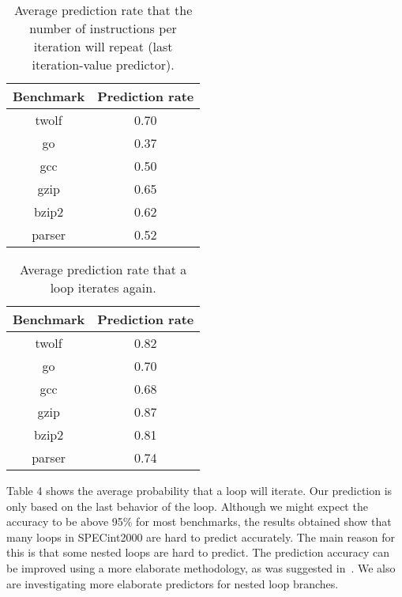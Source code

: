 \documentclass[times,10pt,twocolumn]{article}
\begin{document}
\begin{table}[htb]
\caption{Average prediction rate that the number of 
instructions per iteration will repeat (last iteration-value predictor).}
\begin{center} 
{\footnotesize
\begin{tabular}{|c|c|}
\hline 
Benchmark & Prediction rate \\ \hline \hline 
twolf & 0.70 \\ \hline 
go & 0.37 \\ \hline 
gcc & 0.50 \\ \hline 
gzip & 0.65 \\ \hline 
bzip2 & 0.62 \\ \hline 
parser & 0.52 \\ \hline
\end{tabular}
}
\end{center}
\end{table}

\begin{table}[htb]
\caption{Average prediction rate that a loop iterates again.}
\begin{center} 
{\footnotesize
\begin{tabular}{|c|c|} \hline 
Benchmark & Prediction rate \\ \hline \hline 
twolf & 0.82 \\ \hline 
go & 0.70 \\ \hline 
gcc & 0.68 \\ \hline 
gzip & 0.87 \\ \hline 
bzip2 & 0.81 \\ \hline 
parser & 0.74 \\ \hline
\end{tabular}
}
\end{center}
\end{table}

Table 4 shows the average probability that a loop will iterate.
Our prediction is only based on the last behavior of the loop.
Although we might expect the accuracy to be above 95\% for most benchmarks, 
the results obtained show that many loops in SPECint2000 are hard to predict
accurately.  The main reason for this is that some nested loops are hard to predict. 
The prediction accuracy can be improved using a more elaborate methodology, as
was suggested in~\cite{She00}.  We also are investigating more elaborate predictors
for nested loop branches.
\end{document}
